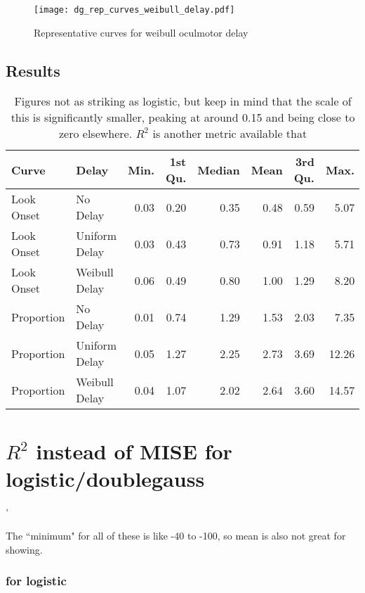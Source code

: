 \begin{figure}[H]
\centering
\texttt{[image: dg\_rep\_curves\_weibull\_delay.pdf]}
\caption{Representative curves for weibull oculmotor delay}
\label{fig:dg_rep_curves_weibull_delay}
\end{figure}

\subsection{Results}

\begin{table}[ht]
\centering
\begin{tabular}{llrrrrrr}
  \hline
Curve & Delay & Min. & 1st Qu. & Median & Mean & 3rd Qu. & Max. \\ 
  \hline
Look Onset & No Delay & 0.03 & 0.20 & 0.35 & 0.48 & 0.59 & 5.07 \\ 
  Look Onset & Uniform Delay & 0.03 & 0.43 & 0.73 & 0.91 & 1.18 & 5.71 \\ 
  Look Onset & Weibull Delay & 0.06 & 0.49 & 0.80 & 1.00 & 1.29 & 8.20 \\ 
  Proportion & No Delay & 0.01 & 0.74 & 1.29 & 1.53 & 2.03 & 7.35 \\ 
  Proportion & Uniform Delay & 0.05 & 1.27 & 2.25 & 2.73 & 3.69 & 12.26 \\ 
  Proportion & Weibull Delay & 0.04 & 1.07 & 2.02 & 2.64 & 3.60 & 14.57 \\ 
   \hline
\end{tabular}
\caption{Figures not as striking as logistic, but keep in mind that the scale of this is significantly smaller, peaking at around 0.15 and being close to zero elsewhere. $R^2$ is another metric available that }
\label{tab:dg_mise_sims}
\end{table}

\section*{$R^2$ instead of MISE for logistic/doublegauss}'

The ``minimum" for all of these is like -40 to -100, so mean is also not great for showing.

\subsubsection{for logistic}

